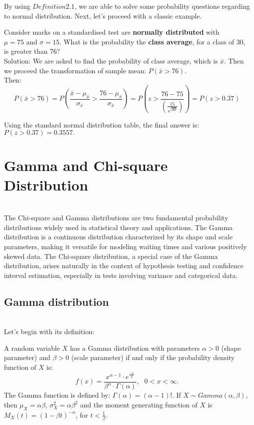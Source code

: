 By using $Definition 2.1$, we are able to solve some probability questions regarding to normal distribution. Next, let's proceed with a classic example.\\

\begin{example}
Consider marks on a standardised test are \textbf{normally distributed} with $\mu = 75 \text{ and } \sigma = 15$. What is the probability the \textbf{class average}, for a class of 30, is greater than 76?\\

Solution: We are asked to find the probability of class average, which is $\bar{x}$. Then we proceed the transformation of sample mean: $P( \bar{x} > 76)$.\\

Then: \[ P(\bar{x} > 76) = P( \frac{ \bar{x} - \mu_{ \bar{x}} }{ \sigma_{\bar{x}}} > \frac{ 76 - \mu_{ \bar{x}}}{\sigma_{\bar{x}}}) = P(z > \frac{76 - 75}{(\frac{15}{\sqrt{30}})}) = P( z > 0.37)\]

Using the standard normal distribution table, the final answer is: $P(z>0.37) = 0.3557.$
\end{example}

\section{Gamma and Chi-square Distribution}\\

\noindent
The Chi-square and Gamma distributions are two fundamental probability distributions widely used in statistical theory and applications. The Gamma distribution is a continuous distribution characterized by its shape and scale parameters, making it versatile for modeling waiting times and various positively skewed data. The Chi-square distribution, a special case of the Gamma distribution, arises naturally in the context of hypothesis testing and confidence interval estimation, especially in tests involving variance and categorical data.

\subsection{Gamma distribution}\\

Let's begin with its definition:

\begin{definition}
A random variable $X$ has a Gamma distribution with parameters $\alpha > 0$ (shape parameter) and $\beta > 0$ (scale parameter) if and only if the probability density function of $X$ is: \[ f(x) = \frac{ x^{\alpha - 1} \cdot e^{\frac{-x}{\beta}}}{ \beta^{\alpha} \cdot {\Gamma(\alpha)}}, \text{ } 0 < x < \infty.\]
The Gamma function is defined by: $\Gamma(\alpha) = (\alpha - 1)!$. If $X \sim Gamma(\alpha, \beta)$, then $\mu_{X} = \alpha \beta \text{, } \sigma_{X}^{2} = \alpha \beta^{2}$ and the moment generating function of $X$ is $M_{X}(t) = (1-\beta t)^{-\alpha}$, for $t < \frac{1}{\beta}$.
\end{definition}

